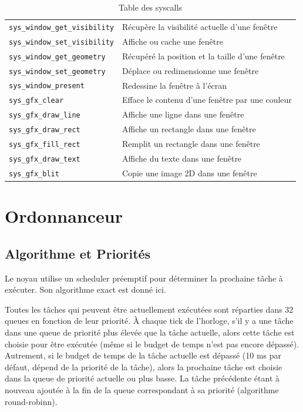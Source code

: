 \documentclass[french, 12pt]{article}
\begin{document}
\begin{table}[]
\begin{tabular}{@{}ll@{}}
\texttt{sys\_window\_get\_visibility} & Récupère la visibilité actuelle d'une fenêtre \\
\texttt{sys\_window\_set\_visibility} & Affiche ou cache une fenêtre \\
\texttt{sys\_window\_get\_geometry} & Récupéré la position et la taille d'une fenêtre \\
\texttt{sys\_window\_set\_geometry} & Déplace ou redimensionne une fenêtre \\
\texttt{sys\_window\_present} & Redessine la fenêtre à l'écran \\
\texttt{sys\_gfx\_clear} & Efface le contenu d'une fenêtre par une couleur \\
\texttt{sys\_gfx\_draw\_line} & Affiche une ligne dans une fenêtre \\
\texttt{sys\_gfx\_draw\_rect} & Affiche un rectangle dans une fenêtre \\
\texttt{sys\_gfx\_fill\_rect} & Remplit un rectangle dans une fenêtre \\
\texttt{sys\_gfx\_draw\_text} & Affiche du texte dans une fenêtre  \\
\texttt{sys\_gfx\_blit} & Copie une image 2D dans une fenêtre \\ \bottomrule
\end{tabular}
\caption{Table des syscalls}
\end{table}

\section{Ordonnanceur}
\subsection{Algorithme et Priorités}

Le noyau utilise un scheduler préemptif pour déterminer la prochaine tâche à exécuter. Son algorithme exact est donné ici.

Toutes les tâches qui peuvent être actuellement exécutées sont réparties dans 32 queues en fonction de leur priorité. À chaque tick de l'horloge, s'il y a une tâche dans une queue de priorité plus élevée que la tâche actuelle, alors cette tâche est choisie pour être exécutée (même si le budget de temps n'est pas encore dépassé). Autrement, si le budget de temps de la tâche actuelle est dépassé (10 ms par défaut, dépend de la priorité de la tâche), alors la prochaine tâche est choisie dans la queue de priorité actuelle ou plus basse. La tâche précédente étant à nouveau ajoutée à la fin de la queue correspondant à sa priorité (algorithme round-robinn).
\end{document}
